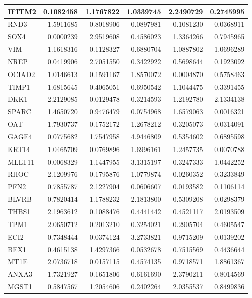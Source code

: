 \documentclass{beamer}\usepackage[]{graphicx}\usepackage[]{color}
\newenvironment{knitrout}{}{} %
\begin{document}
\begin{frame}[fragile]
\begin{knitrout}
\begin{tabular}{l|r|r|r|r|r}
\hline
IFITM2 & 0.1082458 & 1.1767822 & 1.0339745 & 2.2490729 & 0.2745995\\
\hline
RND3 & 1.5911685 & 0.8018906 & 0.0897981 & 0.1081230 & 0.0368911\\
\hline
SOX4 & 0.0000239 & 2.9519608 & 0.4586023 & 1.3364266 & 0.7945965\\
\hline
VIM & 1.1618316 & 0.1128327 & 0.6880704 & 1.0887802 & 1.0696289\\
\hline
NREP & 0.0419906 & 2.7051550 & 0.3422922 & 0.5698644 & 0.1923092\\
\hline
OCIAD2 & 1.0146613 & 0.1591167 & 1.8570072 & 0.0004870 & 0.5758463\\
\hline
TIMP1 & 1.6815645 & 0.4065051 & 0.6950542 & 1.1044475 & 0.3391455\\
\hline
DKK1 & 2.2129085 & 0.0129478 & 0.3214593 & 1.2192780 & 2.1334138\\
\hline
SPARC & 1.4650720 & 0.9476479 & 0.0754968 & 1.6579063 & 0.0016321\\
\hline
OAT & 1.7930737 & 0.1752172 & 1.2678212 & 0.3205073 & 0.0314091\\
\hline
GAGE4 & 0.0775682 & 1.7547958 & 4.9446809 & 0.5354602 & 0.6895598\\
\hline
KRT14 & 1.0465709 & 0.0769896 & 1.6996161 & 1.2457735 & 0.0070788\\
\hline
MLLT11 & 0.0068329 & 1.1447955 & 3.1315197 & 0.3247333 & 1.0442252\\
\hline
RHOC & 2.1209976 & 0.1795876 & 1.0779874 & 0.0260352 & 0.3233849\\
\hline
PFN2 & 0.7855787 & 2.1227904 & 0.0606607 & 0.0193582 & 0.1106114\\
\hline
BLVRB & 0.7820414 & 1.1788232 & 2.1813800 & 0.5309208 & 0.0298379\\
\hline
THBS1 & 2.1963612 & 0.1088476 & 0.4441442 & 0.4521117 & 2.0193509\\
\hline
TPM1 & 2.0650712 & 0.2013210 & 0.3254021 & 0.2905704 & 0.4605547\\
\hline
ECI2 & 0.7348444 & 0.0374124 & 3.2733821 & 0.9715209 & 0.0139202\\
\hline
BEX1 & 0.4615138 & 1.4297366 & 0.0532678 & 0.7515569 & 0.4436644\\
\hline
MT1E & 2.0736718 & 0.0157115 & 0.4574135 & 0.9718571 & 1.8861367\\
\hline
ANXA3 & 1.7321927 & 0.1651806 & 0.6161690 & 2.3790211 & 0.8014569\\
\hline
MGST1 & 0.5847567 & 1.2054606 & 0.2402264 & 2.0355537 & 0.8499836\\

\end{tabular}
\end{knitrout}
\end{frame}
\end{document}
